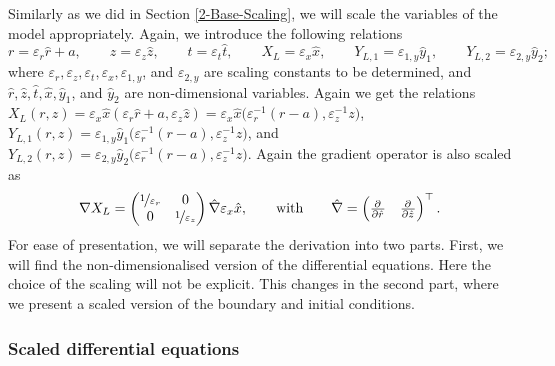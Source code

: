 \documentclass[11pt]{article}
\numberwithin{equation}{section}
\begin{document}
Similarly as we did in Section \ref{2-Base-Scaling}, 
we will scale the variables of the model appropriately. Again, we introduce the following relations
\[
    r = \varepsilon_r \hat{r} + a,
    \qquad
    z = \varepsilon_z \hat{z},
    \qquad
    t = \varepsilon_t \hat{t},
    \qquad
    X_L = \varepsilon_x \hat{x},
    \qquad
    Y_{L,1} = \varepsilon_{1,y} \hat{y}_1,
    \qquad
    Y_{L,2} = \varepsilon_{2,y} \hat{y}_2;
\]
where \( \varepsilon_r, \varepsilon_z, \varepsilon_t, \varepsilon_x, \varepsilon_{1,y}\), and \(\varepsilon_{2,y}\) are scaling constants to be determined, and \(\hat{r}, \hat z, \hat t, \hat x, \hat y_1\), and \(\hat y_2\) are non-dimensional variables.
Again we get the relations \(X_L(r,z) = \varepsilon_x \hat{x} (\varepsilon_r \hat r + a, \varepsilon_z \hat z) = \varepsilon_x \hat{x} \big( \varepsilon_r^{-1} (r-a) , \varepsilon_z^{-1} z\big) \), \(Y_{L,1} (r,z) = \varepsilon_{1,y} \hat{y}_1 \big( \varepsilon_r^{-1} (r-a), \varepsilon_z^{-1} z \big)\), and \(Y_{L,2} (r,z) = \varepsilon_{2,y} \hat{y}_2 \big( \varepsilon_r^{-1} (r-a), \varepsilon_z^{-1} z \big)\). Again the gradient operator is also scaled as
\[
    \nabla X_L =
    \begin{pmatrix}
        \nicefrac{1}{\varepsilon_r} & 0 \\
        0 & \nicefrac{1}{\varepsilon_z}
    \end{pmatrix}
    \hat{\nabla} \varepsilon_x \hat{x},
    \qquad \text{with} \qquad
    \hat{\nabla} = 
    \begin{pmatrix}
        \pd{ }{\hat r}
        &
        \pd{ }{\hat z}
    \end{pmatrix}^\top .
\]
For ease of presentation, we will separate the derivation into two parts. First, we will find the non-dimensionalised version of the differential equations. Here the choice of the scaling will not be explicit. This changes in the second part, where we present a scaled version of the boundary and initial conditions.

\subsubsection{Scaled differential equations}
\end{document}

